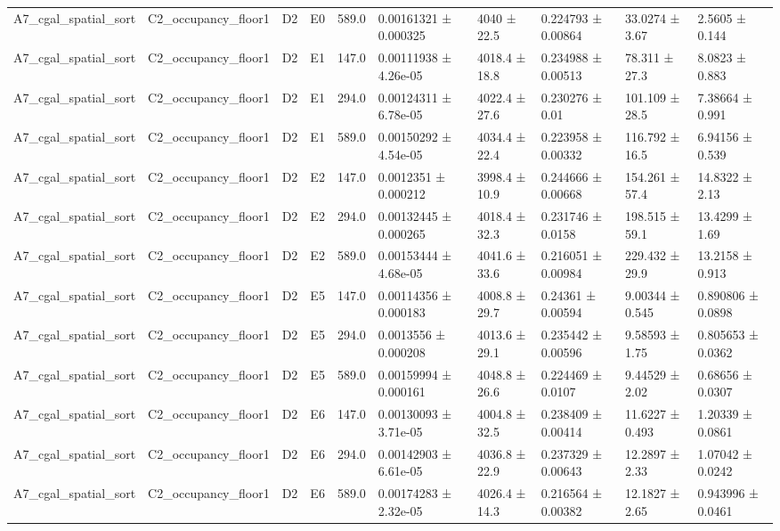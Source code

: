 \begin{table}
\begin{tabular}{llllllllll}
A7\_cgal\_spatial\_sort & C2\_occupancy\_floor1 & D2 & E0 & 589.0 & 0.00161321 ± 0.000325 & 4040 ± 22.5 & 0.224793 ± 0.00864 & 33.0274 ± 3.67 & 2.5605 ± 0.144 \\
A7\_cgal\_spatial\_sort & C2\_occupancy\_floor1 & D2 & E1 & 147.0 & 0.00111938 ± 4.26e-05 & 4018.4 ± 18.8 & 0.234988 ± 0.00513 & 78.311 ± 27.3 & 8.0823 ± 0.883 \\
A7\_cgal\_spatial\_sort & C2\_occupancy\_floor1 & D2 & E1 & 294.0 & 0.00124311 ± 6.78e-05 & 4022.4 ± 27.6 & 0.230276 ± 0.01 & 101.109 ± 28.5 & 7.38664 ± 0.991 \\
A7\_cgal\_spatial\_sort & C2\_occupancy\_floor1 & D2 & E1 & 589.0 & 0.00150292 ± 4.54e-05 & 4034.4 ± 22.4 & 0.223958 ± 0.00332 & 116.792 ± 16.5 & 6.94156 ± 0.539 \\
A7\_cgal\_spatial\_sort & C2\_occupancy\_floor1 & D2 & E2 & 147.0 & 0.0012351 ± 0.000212 & 3998.4 ± 10.9 & 0.244666 ± 0.00668 & 154.261 ± 57.4 & 14.8322 ± 2.13 \\
A7\_cgal\_spatial\_sort & C2\_occupancy\_floor1 & D2 & E2 & 294.0 & 0.00132445 ± 0.000265 & 4018.4 ± 32.3 & 0.231746 ± 0.0158 & 198.515 ± 59.1 & 13.4299 ± 1.69 \\
A7\_cgal\_spatial\_sort & C2\_occupancy\_floor1 & D2 & E2 & 589.0 & 0.00153444 ± 4.68e-05 & 4041.6 ± 33.6 & 0.216051 ± 0.00984 & 229.432 ± 29.9 & 13.2158 ± 0.913 \\
A7\_cgal\_spatial\_sort & C2\_occupancy\_floor1 & D2 & E5 & 147.0 & 0.00114356 ± 0.000183 & 4008.8 ± 29.7 & 0.24361 ± 0.00594 & 9.00344 ± 0.545 & 0.890806 ± 0.0898 \\
A7\_cgal\_spatial\_sort & C2\_occupancy\_floor1 & D2 & E5 & 294.0 & 0.0013556 ± 0.000208 & 4013.6 ± 29.1 & 0.235442 ± 0.00596 & 9.58593 ± 1.75 & 0.805653 ± 0.0362 \\
A7\_cgal\_spatial\_sort & C2\_occupancy\_floor1 & D2 & E5 & 589.0 & 0.00159994 ± 0.000161 & 4048.8 ± 26.6 & 0.224469 ± 0.0107 & 9.44529 ± 2.02 & 0.68656 ± 0.0307 \\
A7\_cgal\_spatial\_sort & C2\_occupancy\_floor1 & D2 & E6 & 147.0 & 0.00130093 ± 3.71e-05 & 4004.8 ± 32.5 & 0.238409 ± 0.00414 & 11.6227 ± 0.493 & 1.20339 ± 0.0861 \\
A7\_cgal\_spatial\_sort & C2\_occupancy\_floor1 & D2 & E6 & 294.0 & 0.00142903 ± 6.61e-05 & 4036.8 ± 22.9 & 0.237329 ± 0.00643 & 12.2897 ± 2.33 & 1.07042 ± 0.0242 \\
A7\_cgal\_spatial\_sort & C2\_occupancy\_floor1 & D2 & E6 & 589.0 & 0.00174283 ± 2.32e-05 & 4026.4 ± 14.3 & 0.216564 ± 0.00382 & 12.1827 ± 2.65 & 0.943996 ± 0.0461 \\

\end{tabular}
\end{table}
